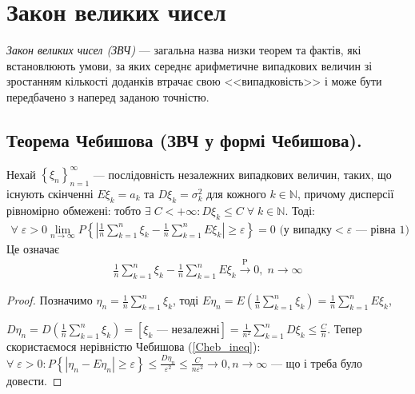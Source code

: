 \section{Закон великих чисел}
\emph{Закон великих чисел (ЗВЧ)} --- загальна назва низки теорем та фактів, які встановлюють умови, 
за яких середнє арифметичне випадкових величин зі зростанням кількості доданків втрачає 
свою <<випадковість>> і може бути передбачено з наперед заданою точністю.

\subsection{Теорема Чебишова (ЗВЧ у формі Чебишова).}

\begin{theorem*}
    Нехай $\left\{ \xi_n\right\}_{n=1}^{\infty}$ --- послідовність незалежних випадкових величин, 
    таких, що існують скінченні $E\xi_k = a_k$ та $D\xi_k = \sigma_k^2$ для кожного $k \in \mathbb{N}$,
    причому дисперсії рівномірно 
    обмежені: тобто $\exists\; C < +\infty : D\xi_k \leq C \;\forall\; k \in \mathbb{N}$. 
    Тоді:
    \begin{gather}
        \forall \; \varepsilon > 0 \lim_{n \rightarrow \infty} P\left\{\left|
            \frac{1}{n}\sum\limits_{k=1}^n \xi_k - \frac{1}{n}\sum\limits_{k=1}^n E\xi_k 
        \right| \geq \varepsilon\right\} = 0 \text{ (у випадку} < \varepsilon\text{ --- рівна 1)}
    \end{gather}
    Це означає
    \begin{gather}
        \frac{1}{n}\sum\limits_{k=1}^n \xi_k - \frac{1}{n}\sum\limits_{k=1}^n E\xi_k \overset{\mathrm{P}}{\longrightarrow} 0, \; n \to \infty
    \end{gather}
\end{theorem*}
\begin{proof}
    Позначимо $\eta_n = \frac{1}{n}\sum\limits_{k=1}^n \xi_k$, тоді $E\eta_n = E\left(\frac{1}{n}\sum\limits_{k=1}^n \xi_k \right) = \frac{1}{n}\sum\limits_{k=1}^n E\xi_k$,

    \noindent$D\eta_n = D\left( \frac{1}{n}\sum\limits_{k=1}^n \xi_k\right) = \left[\xi_k \text{ --- незалежні} \right] = \frac{1}{n^2}\sum\limits_{k=1}^n D\xi_k \leq \frac{C}{n}$.
    Тепер скористаємося нерівністю Чебишова (\ref{Cheb_ineq}): 
    $\forall \; \varepsilon >0 : P\left\{ \left|\eta_n - E\eta_n \right| \geq \varepsilon\right\} \leq \frac{D\eta_n}{\varepsilon^2} \leq \frac{C}{n \varepsilon^2} \to 0, n\to\infty$
    --- що і треба було довести.
\end{proof}
